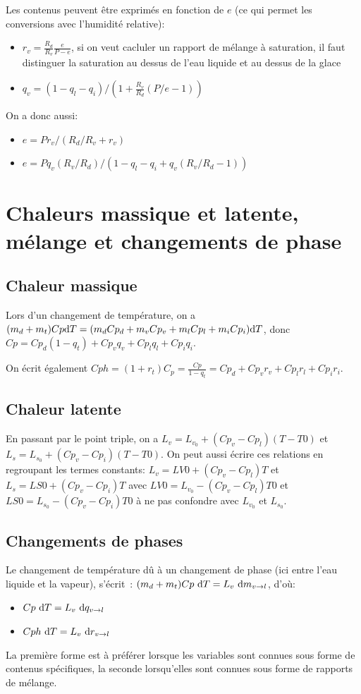 \documentclass{article}
\begin{document}
Les contenus peuvent être exprimés en fonction de $e$ (ce qui permet les conversions avec l'humidité relative):
\begin{itemize}
 \item $r_v=\frac{R_d}{R_v}\frac{e}{P-e}$, si on veut cacluler un rapport de mélange à saturation, il faut distinguer la saturation au dessus de l'eau liquide et au dessus de la glace
 \item $q_v=(1-q_l-q_i)/(1+\frac{R_v}{R_d}(P/e-1))$
\end{itemize}
On a donc aussi:
\begin{itemize}
 \item $e=P r_v / (R_d/R_v +r_v)$
 \item $e=P q_v (R_v/R_d) / (1-q_l-q_i+q_v(R_v/R_d-1))$
\end{itemize}

\section{Chaleurs massique et latente, mélange et changements de phase}
\label{Cp}
\subsection{Chaleur massique}
Lors d'un changement de température, on a $(m_d+m_t)Cp {\rm d}T=(m_d Cp_d + m_v Cp_v + m_l Cp_l + m_i Cp_i){\rm d}T$, donc {\color{red}$Cp=Cp_d(1-q_t)+Cp_v q_v + Cp_l q_l + Cp_i q_i$}.

On écrit également {\color{red}$Cph=(1+r_t)C_p=\frac{Cp}{1-q_t}=Cp_d+Cp_v r_v + Cp_l r_l + Cp_i r_i$}.

\subsection{Chaleur latente}
En passant par le point triple, on a {\color{red}$L_v=L_{v_0}+(Cp_v-Cp_l)(T-T0)$} et {\color{red}$L_s=L_{s_0}+(Cp_v-Cp_i)(T-T0)$}.
On peut aussi écrire ces relations en regroupant les termes constants: $L_v=LV0+(Cp_v-Cp_l)T$ et $L_s=LS0+(Cp_v-Cp_i)T$ avec $LV0=L_{v_0}-(Cp_v-Cp_l)T0$ et $LS0=L_{s_0}-(Cp_v-Cp_i)T0$ à ne pas confondre avec $L_{v_0}$ et $L_{s_0}$.

\subsection{Changements de phases}
Le changement de température dû à un changement de phase (ici entre l'eau liquide et la vapeur), s'écrit~: $(m_d+m_t)Cp{\ \rm d}T=L_v {\ \rm d}m_{v\rightarrow l}$, d'où:
\begin{itemize}
 \item {\color{red}$Cp{\ \rm d}T=L_v{\ \rm d}q_{v\rightarrow l}$}
 \item {\color{red}$Cph{\ \rm d}T=L_v{\ \rm d}r_{v\rightarrow l}$}
\end{itemize}
La première forme est à préférer lorsque les variables sont connues sous forme de contenus spécifiques, la seconde lorsqu'elles sont connues sous forme de rapports de mélange.
\end{document}
